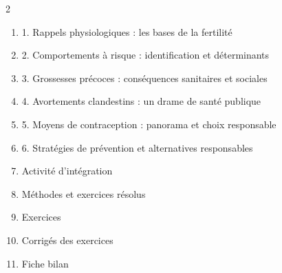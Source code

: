\documentclass[11pt]{article}
\begin{document}
\begin{sommaire}
\begin{multicols}{2}
\begin{enumerate}
\item 1. Rappels physiologiques : les bases de la fertilité
\item 2. Comportements à risque : identification et déterminants
\item 3. Grossesses précoces : conséquences sanitaires et sociales
\item 4. Avortements clandestins : un drame de santé publique
\item 5. Moyens de contraception : panorama et choix responsable
\item 6. Stratégies de prévention et alternatives responsables
\item Activité d'intégration
\item Méthodes et exercices résolus
\item Exercices
\item Corrigés des exercices
\item Fiche bilan
\end{enumerate}
\end{multicols}
\end{sommaire}
\end{document}
